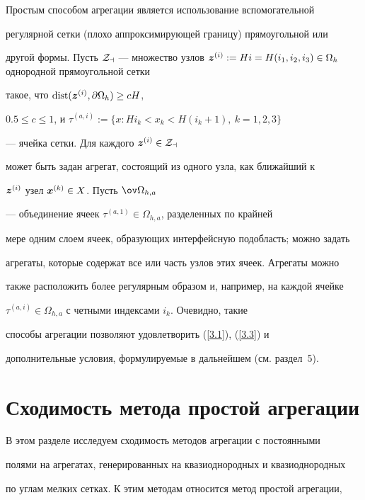 Простым способом агрегации является использование вспомогательной


регулярной сетки (плохо аппроксимирующей границу) прямоугольной или


другой формы. Пусть $\cal Z_a$ --- множество узлов $\bi z\up


i:=Hi=H(i_1, i_2, i_3)\in \Omega_h$ однородной прямоугольной сетки


такое, что $\operatorname{dist}(\boldsymbol z^{(i)}, \partial\Omega_h)\ge c H$,


$0.5\le c\le 1$, и $\tau^{(a,i)}:=\{x: Hi_k<x_k<H(i_k+1),\ k=1,2,3\}$


--- ячейка сетки. Для каждого $\boldsymbol z^{(i)}\in\cal Z_a$


может быть задан агрегат, состоящий из одного узла, как ближайший к


$\boldsymbol z^{(i)}$ узел $\boldsymbol x^{(k)}\in X$. Пусть $\ov\Omega_{h,a}$


--- объединение ячеек $\tau^{(a,1)}\in\Omega_{h,a}$, разделенных по крайней


мере одним слоем ячеек, образующих интерфейсную подобласть; можно задать


агрегаты, которые содержат все или часть узлов этих ячеек. Агрегаты можно


также расположить более регулярным образом и, например, на каждой ячейке


$\tau^{(a,i)}\in\Omega_{h,a}$ с четными индексами $i_k$. Очевидно, такие


способы агрегации позволяют удовлетворить (\ref{3.1}), (\ref{3.3}) и


дополнительные условия, формулируемые в дальнейшем (см. раздел~5).














\section{Сходимость метода простой агрегации}





В этом разделе исследуем сходимость методов агрегации с постоянными


полями на агрегатах, генерированных на квазиоднородных и квазиоднородных


по углам мелких сетках. К этим методам относится метод простой агрегации,


